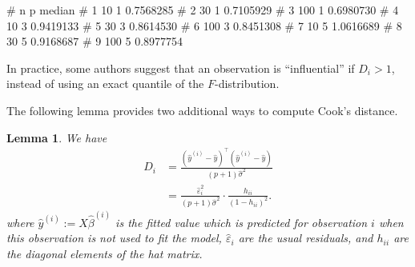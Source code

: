 \documentclass[
  a4paper,
]{article}
\newenvironment{Shaded}{\begin{snugshade}}{\end{snugshade}}
\newcommand{\AttributeTok}[1]{\textcolor[rgb]{0.13,0.29,0.53}{#1}}
\newcommand{\DecValTok}[1]{\textcolor[rgb]{0.00,0.00,0.81}{#1}}
\newcommand{\FloatTok}[1]{\textcolor[rgb]{0.00,0.00,0.81}{#1}}
\newcommand{\FunctionTok}[1]{\textcolor[rgb]{0.13,0.29,0.53}{\textbf{#1}}}
\newcommand{\NormalTok}[1]{#1}
\newcommand{\OtherTok}[1]{\textcolor[rgb]{0.56,0.35,0.01}{#1}}
\newcommand{\SpecialCharTok}[1]{\textcolor[rgb]{0.81,0.36,0.00}{\textbf{#1}}}
\newtheorem{lemma}{Lemma}[section]
\theoremstyle{definition}
\theoremstyle{definition}
\theoremstyle{definition}
\theoremstyle{definition}
\theoremstyle{remark}
\begin{document}
\begin{Shaded}
\end{Shaded}

\begin{Shaded}
\begin{Highlighting}[]
\NormalTok{\#     n p    median}
\NormalTok{\# 1  10 1 0.7568285}
\NormalTok{\# 2  30 1 0.7105929}
\NormalTok{\# 3 100 1 0.6980730}
\NormalTok{\# 4  10 3 0.9419133}
\NormalTok{\# 5  30 3 0.8614530}
\NormalTok{\# 6 100 3 0.8451308}
\NormalTok{\# 7  10 5 1.0616689}
\NormalTok{\# 8  30 5 0.9168687}
\NormalTok{\# 9 100 5 0.8977754}
\end{Highlighting}
\end{Shaded}

In practice, some authors suggest that an observation is ``influential''
if \(D_i > 1\), instead of using an exact quantile of the \(F\)-distribution.

The following lemma provides two additional ways to compute Cook's
distance.

\begin{lemma}
\protect\hypertarget{lem:Cook-D-alt}{}\label{lem:Cook-D-alt}We have
\begin{align*}
  D_i
  &= \frac{(\hat y^{(i)} - \hat y)^\top (\hat y^{(i)} - \hat y)}{(p+1)\hat\sigma^2} \\
  &= \frac{\hat\varepsilon_i^2}{(p+1)\hat\sigma^2} \cdot \frac{h_{ii}}{(1-h_{ii})^2}.
\end{align*}
where \(\hat y^{(i)} := X \hat\beta^{(i)}\) is the fitted value which is
predicted for observation \(i\) when this observation is not used to fit the
model, \(\hat\varepsilon_i\) are the usual residuals, and \(h_{ii}\) are the
diagonal elements of the hat matrix.
\end{lemma}
\end{document}
